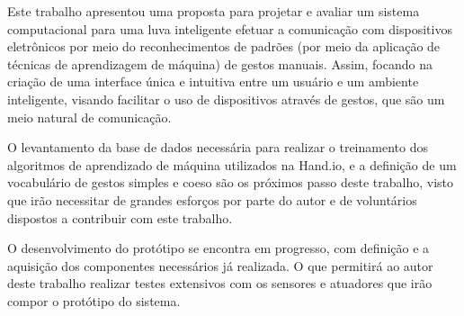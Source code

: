 \label{chapter:consi}

Este trabalho apresentou uma proposta para projetar e avaliar um sistema computacional para uma luva inteligente efetuar a comunicação com dispositivos eletrônicos por meio do reconhecimentos de padrões (por meio da aplicação de técnicas de aprendizagem de máquina) de gestos manuais. 
Assim, focando na criação de uma interface única e intuitiva entre um usuário e um ambiente inteligente, visando facilitar o uso de dispositivos através de gestos, que são um meio natural de comunicação.

O levantamento da base de dados necessária para realizar o treinamento dos algoritmos de aprendizado de máquina utilizados na Hand.io, e a definição de um vocabulário de gestos simples e coeso são os próximos passo deste trabalho, visto que irão necessitar de grandes esforços por parte do autor e de voluntários dispostos a contribuir com este trabalho. 

O desenvolvimento do protótipo se encontra em progresso, com definição e a aquisição dos componentes necessários já realizada. O que permitirá ao autor deste trabalho realizar testes extensivos com os sensores e atuadores que irão compor o protótipo do sistema.

